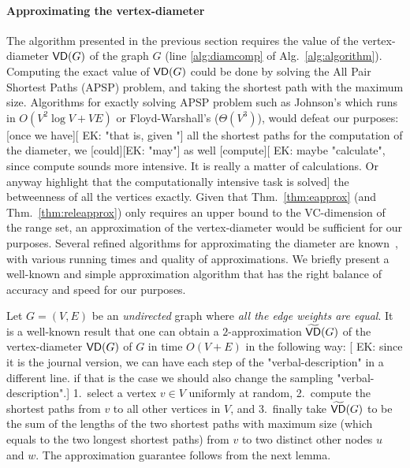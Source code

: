 \paragraph{Approximating the vertex-diameter}%
The algorithm presented in the previous section requires the value of the
vertex-diameter $\mathsf{VD}(G)$ of the graph $G$ (line
\ref{alg:diamcomp} of Alg.~\ref{alg:algorithm}). 
Computing the exact value of $\mathsf{VD}(G)$ could be done by solving the All Pair
Shortest Paths (APSP) problem, and taking the shortest path with the maximum size.
Algorithms for exactly solving APSP problem such as Johnson's which runs in
$O(V^2\log V+VE)$ or Floyd-Warshall's ($\Theta(V^3)$), would defeat our
purposes: [once we have][ EK: "that is, given "]  all the shortest paths for the computation of
the diameter, we [could][EK: "may"] as well [compute][ EK: maybe "calculate", since compute sounds more intensive. It 
is really a matter of calculations. Or anyway highlight that the computationally intensive task is solved]
the betweenness of all the vertices exactly. 
Given that Thm.~\ref{thm:eapprox} (and Thm.~\ref{thm:releapprox})  only
requires an upper bound to the VC-dimension of the range set, an approximation
of the vertex-diameter would be sufficient for our purposes. Several refined
algorithms for approximating the diameter are
known~\citep{AingwordCIM99,BoitmanisFL06,RodittyW12}, with various running times
and quality of approximations. We briefly present a well-known and simple
approximation algorithm that has the right balance of accuracy and speed
for our purposes.

Let $G=(V,E)$ be an \emph{undirected} graph where \emph{all the edge weights are
equal}.
It is a well-known result that one can obtain a $2$-approximation
$\widetilde{\mathsf{VD}}(G)$ of the vertex-diameter $\mathsf{VD}(G)$ of $G$ in time $O(V+E)$ in
the following way: [ EK: since it is the journal version, we can have each step of the "verbal-description" in a 
different line. if that is the case we should also change the sampling "verbal-description".]
1.~select a vertex $v\in V$ uniformly at random, 2.~compute
the shortest paths from $v$ to all other vertices in $V$, and 3.~finally take
$\widetilde{\mathsf{VD}}(G)$ to be the sum of the lengths of the two shortest paths with
maximum size (which equals to the two longest shortest paths) from $v$ to two
distinct other nodes $u$ and $w$. 
\ifproof
The approximation guarantee follows from the next lemma.


